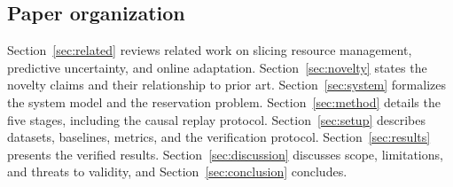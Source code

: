 \subsection{Paper organization}

Section~\ref{sec:related} reviews related work on slicing resource
management, predictive uncertainty, and online adaptation.
Section~\ref{sec:novelty} states the novelty claims and their
relationship to prior art. Section~\ref{sec:system} formalizes the
system model and the reservation problem. Section~\ref{sec:method}
details the five stages, including the causal replay protocol.
Section~\ref{sec:setup} describes datasets, baselines, metrics, and
the verification protocol. Section~\ref{sec:results} presents the
verified results. Section~\ref{sec:discussion} discusses scope,
limitations, and threats to validity, and Section~\ref{sec:conclusion}
concludes.
